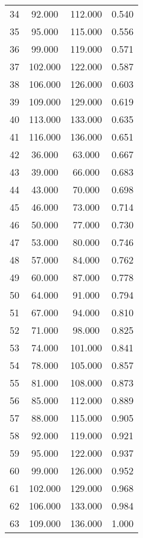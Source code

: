 \begin{tabular}{cccc}
  34 & 92.000 & 112.000 & 0.540 \\ 
  35 & 95.000 & 115.000 & 0.556 \\ 
  36 & 99.000 & 119.000 & 0.571 \\ 
  37 & 102.000 & 122.000 & 0.587 \\ 
  38 & 106.000 & 126.000 & 0.603 \\ 
  39 & 109.000 & 129.000 & 0.619 \\ 
  40 & 113.000 & 133.000 & 0.635 \\ 
  41 & 116.000 & 136.000 & 0.651 \\ 
  42 & 36.000 & 63.000 & 0.667 \\ 
  43 & 39.000 & 66.000 & 0.683 \\ 
  44 & 43.000 & 70.000 & 0.698 \\ 
  45 & 46.000 & 73.000 & 0.714 \\ 
  46 & 50.000 & 77.000 & 0.730 \\ 
  47 & 53.000 & 80.000 & 0.746 \\ 
  48 & 57.000 & 84.000 & 0.762 \\ 
  49 & 60.000 & 87.000 & 0.778 \\ 
  50 & 64.000 & 91.000 & 0.794 \\ 
  51 & 67.000 & 94.000 & 0.810 \\ 
  52 & 71.000 & 98.000 & 0.825 \\ 
  53 & 74.000 & 101.000 & 0.841 \\ 
  54 & 78.000 & 105.000 & 0.857 \\ 
  55 & 81.000 & 108.000 & 0.873 \\ 
  56 & 85.000 & 112.000 & 0.889 \\ 
  57 & 88.000 & 115.000 & 0.905 \\ 
  58 & 92.000 & 119.000 & 0.921 \\ 
  59 & 95.000 & 122.000 & 0.937 \\ 
  60 & 99.000 & 126.000 & 0.952 \\ 
  61 & 102.000 & 129.000 & 0.968 \\ 
  62 & 106.000 & 133.000 & 0.984 \\ 
  63 & 109.000 & 136.000 & 1.000 \\ 
   \hline
\end{tabular}
